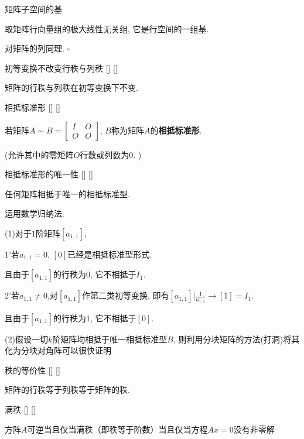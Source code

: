 \documentclass[UTF8]{ctexart}
\begin{document}
		\begin{prf}
			{}
			{矩阵子空间的基}
			{}
			{}

			取矩阵行向量组的极大线性无关组, 它是行空间的一组基. 
			
			对矩阵的列同理. $\square$
		\end{prf}
  
		\begin{ppt}
			[]
			{初等变换不改变行秩与列秩}
			[]
			[]

			矩阵的行秩与列秩在初等变换下不变. 
		\end{ppt}
		
		\begin{dfn}
			[]
			{相抵标准形}
			[]
			[]

			若矩阵$A\sim B=
			\begin{bmatrix}
			I & O \\
			O & O 
			\end{bmatrix}$, $B$称为矩阵$A$的\textbf{相抵标准形}. 
			
			(允许其中的零矩阵$O$行数或列数为$0$. )
		\end{dfn}
		
		\begin{ppt}
			[]
			{相抵标准形的唯一性}
			[]
			[]

			任何矩阵相抵于唯一的相抵标准型. 
		\end{ppt}
  
		\begin{prf}
			运用数学归纳法. 
			
			(1)对于$1$阶矩阵$[a_{1,1}]$, 
			
			1'若$a_{1,1}=0$, $[0]$已经是相抵标准型形式. 
			
			且由于$[a_{1,1}]$的行秩为0, 它不相抵于$I_1$. 
			
			2'若$a_{1,1}\neq 0$,对$[a_{1,1}]$作第二类初等变换, 即有$[a_{1,1}]|\frac{1}{a_{1,1}}\longrightarrow[1]=I_1. $
			
			且由于$[a_{1,1}]$的行秩为1, 它不相抵于$[0]$. 
			
			(2)假设一切$k$阶矩阵均相抵于唯一相抵标准型$B$, 则利用分块矩阵的方法(打洞)将其化为分块对角阵可以很快证明
		\end{prf}
  
		\begin{thm}
			[]
			{秩的等价性}
			[]
			[]

			矩阵的行秩等于列秩等于矩阵的秩. 
		\end{thm}
  
        \begin{thm}
			[]
			{满秩}
			[]
			[]

            方阵$A$可逆当且仅当满秩（即秩等于阶数）当且仅当方程$Ax=0$没有非零解
        \end{thm}
        
\end{document}

